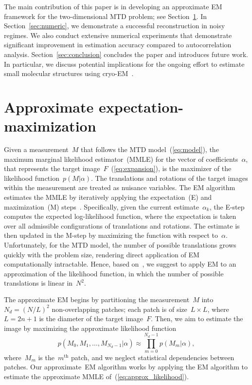 \documentclass{article}
\begin{document}
The main contribution of this paper is in developing an approximate EM framework for the two-dimensional MTD problem; see Section~\ref{sec:EM}. In Section~\ref{sec:numeric}, we demonstrate a successful reconstruction in noisy regimes.
We also conduct extensive numerical experiments that  demonstrate significant improvement in estimation accuracy compared to autocorrelation analysis.
 Section~\ref{sec:conclusion} concludes the paper and introduces  future work.
In particular, we discuss potential implications for the ongoing effort
to estimate small molecular structures using cryo-EM~\cite{bendory2018toward}.

\section{Approximate expectation-maximization}
\label{sec:EM}
Given a measurement~$M$ that follows the MTD model~(\ref{eq:model}), the maximum marginal likelihood estimator~(MMLE) for the vector of coefficients~$\alpha$, that represents the target image~$F$~(\ref{eq:expansion}), is the maximizer of the likelihood function~$p(M | \alpha)$. The translations and rotations of the target images within the measurement are treated as nuisance variables. The EM algorithm estimates the MMLE by iteratively applying the expectation~(E) and maximization~(M) steps~\cite{dempster1977maximum}. Specifically, given the current estimate~$\alpha_k$, the \mbox{E-step} computes the expected log-likelihood function, where the expectation is taken over all admissible configurations of translations and rotations. The estimate is then updated in the \mbox{M-step} by maximizing the function with respect to~$\alpha$. Unfortunately, for the MTD model, the number of possible translations grows quickly with the problem size, rendering direct application of EM computationally intractable. Hence, based on~\cite{lan2020multi}, we suggest to apply EM to an approximation of the likelihood function, in which the number of possible translations is linear in~$N^2$.

The approximate EM begins by partitioning the measurement~$M$ into~$N_d = (N / L)^2$ \mbox{non-overlapping} patches; each patch is of size~\mbox{$L \times L$}, where~\mbox{$L = 2n + 1$} is the diameter of the target image~$F$. Then, we aim to estimate the image by maximizing the approximate likelihood function
\begin{equation}
\label{eq:approx_likelihood}
p(M_0, M_1, \ldots, M_{N_d-1}|\alpha) \approx \prod_{m = 0}^{N_d - 1} p(M_m|\alpha),
\end{equation}
where~$M_m$ is the~$m^{\text{th}}$ patch, and we neglect statistical dependencies between patches. Our approximate~EM algorithm works by applying the EM algorithm to estimate the approximate MMLE of~(\ref{eq:approx_likelihood}).
\end{document}
